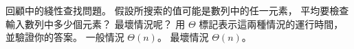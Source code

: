 \startEXERCISE
回顧中的綫性查找問題。
假設所搜索的值可能是數列中的任一元素，
平均要檢查輸入數列中多少個元素？
最壞情況呢？
用 $\Theta$ 標記表示這兩種情況的運行時間，
並驗證你的答案。
\stopEXERCISE
\startANSWER
一般情況 $\Theta(n)$。
最壞情況 $\Theta(n)$。
\stopANSWER

